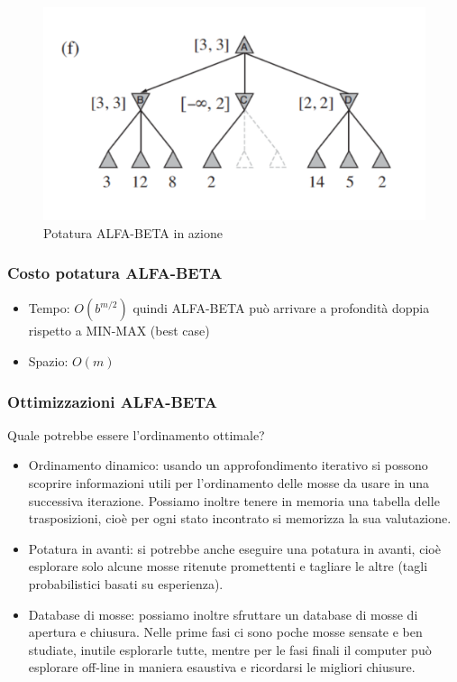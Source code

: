 \documentclass{article}
\begin{document}
\begin{figure}[h!]
\includegraphics[scale=0.25]{Images/alfabetaaction5.png}
\caption{Potatura ALFA-BETA in azione}
\end{figure}
\clearpage

\subsubsection{Costo potatura ALFA-BETA}
\begin{itemize}
    \item Tempo: $O(b^{m/2})$ quindi ALFA-BETA può arrivare a profondità doppia rispetto a MIN-MAX (best case)
    \item Spazio: $O(m)$
\end{itemize}

\subsubsection{Ottimizzazioni ALFA-BETA}
Quale potrebbe essere l'ordinamento ottimale? 
\begin{itemize}
    \item Ordinamento dinamico: usando un approfondimento iterativo si possono scoprire informazioni utili per l’ordinamento delle mosse da usare in una successiva iterazione. Possiamo inoltre tenere in memoria una tabella delle trasposizioni, cioè per ogni stato incontrato si memorizza la sua valutazione.
    \item Potatura in avanti: si potrebbe anche eseguire una potatura in avanti, cioè esplorare solo alcune mosse ritenute promettenti e tagliare le altre (tagli probabilistici basati su esperienza).
    \item Database di mosse: possiamo inoltre sfruttare un database di mosse di apertura e chiusura. Nelle prime fasi ci sono poche mosse sensate e ben studiate, inutile esplorarle tutte, mentre per le fasi finali il computer può esplorare off-line in maniera esaustiva e ricordarsi le migliori chiusure.
\end{itemize}  
\end{document}
